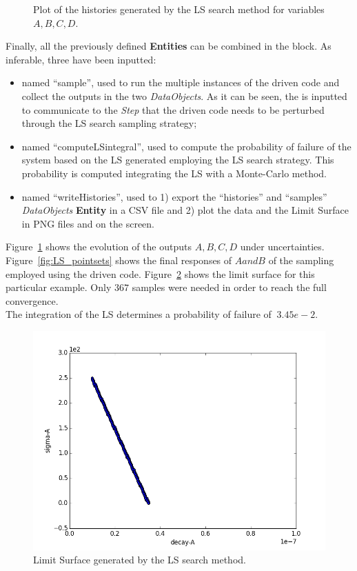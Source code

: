 \begin{enumerate}
\begin{figure}[h!]
  \caption{Plot of the histories generated by the LS search method for variables $A,B,C,D$.}
  \label{fig:LS_histories}
 \end{figure}
   Finally, all the previously defined \textbf{Entities} can be combined in 
   the  block. As inferable, 
   three  have been inputted:
   \begin{itemize}
     \item {} named ``sample'', used to run the multiple  
     instances of the driven code and 
     collect the outputs in the two \textit{DataObjects}. As it can be
     seen, the  is inputted to communicate to the 
     \textit{Step} that the driven code needs to
     be perturbed through the LS search sampling strategy;
     \item {} named ``computeLSintegral'', used to 
     compute the probability of failure of the system based on the LS generated employing the LS search strategy. This 
     probability is computed integrating the LS with a Monte-Carlo 
     method. 
     \item  {} named ``writeHistories'', used to 1) export 
     the ``histories'' and ``samples''  \textit{DataObjects} 
     \textbf{Entity} in a CSV file and 2) plot the data and the Limit Surface 
     in  PNG files and on the screen.
   \end{itemize}
\end{enumerate} 
 Figure~\ref{fig:LS_histories} 
 shows the evolution of the outputs $A,B,C,D$ under uncertainties. 
 Figure~\ref{fig:LS_pointsets} shows the final responses  of $A and B$
 of the sampling employed using the driven code. 
 Figure~\ref{fig:LSplot}  shows the limit surface for this particular 
 example. Only $367$ samples were needed in order to reach the full 
 convergence.
 \\The integration of the LS determines a probability of failure of 
 $~3.45e-2$.
 \begin{figure}[h!]
  \centering
  \includegraphics[scale=0.7]{pics/LimitSurfacePlot.png}
  \caption{Limit Surface generated by the LS search method.}
  \label{fig:LSplot}
 \end{figure}








